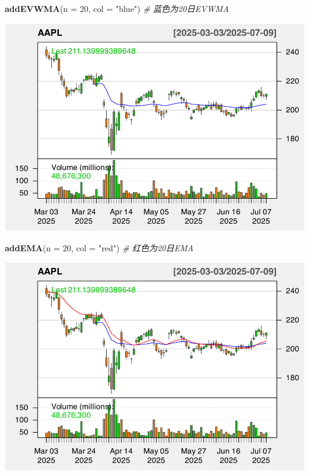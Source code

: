 \documentclass[]{ctexbook}
\newenvironment{Shaded}{\begin{snugshade}}{\end{snugshade}}
\newcommand{\AttributeTok}[1]{\textcolor[rgb]{0.13,0.29,0.53}{#1}}
\newcommand{\CommentTok}[1]{\textcolor[rgb]{0.56,0.35,0.01}{\textit{#1}}}
\newcommand{\DecValTok}[1]{\textcolor[rgb]{0.00,0.00,0.81}{#1}}
\newcommand{\FunctionTok}[1]{\textcolor[rgb]{0.13,0.29,0.53}{\textbf{#1}}}
\newcommand{\NormalTok}[1]{#1}
\newcommand{\StringTok}[1]{\textcolor[rgb]{0.31,0.60,0.02}{#1}}
\begin{document}
\begin{Shaded}
\begin{Highlighting}[]
\FunctionTok{addEVWMA}\NormalTok{(}\AttributeTok{n =} \DecValTok{20}\NormalTok{, }\AttributeTok{col =} \StringTok{"blue"}\NormalTok{)   }\CommentTok{\# 蓝色为20日EVWMA}
\end{Highlighting}
\end{Shaded}

\includegraphics[width=0.9\linewidth]{quantmod_files/figure-latex/evwma-2}

\begin{Shaded}
\begin{Highlighting}[]
\FunctionTok{addEMA}\NormalTok{(}\AttributeTok{n =} \DecValTok{20}\NormalTok{, }\AttributeTok{col =} \StringTok{"red"}\NormalTok{)      }\CommentTok{\# 红色为20日EMA}
\end{Highlighting}
\end{Shaded}

\includegraphics[width=0.9\linewidth]{quantmod_files/figure-latex/evwma-3}
\end{document}
